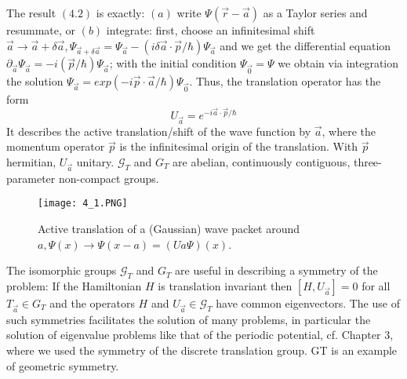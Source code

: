 The result $(4.2)$ is exactly: $(a)$ write $\Psi(\vec{r}-\vec{a})$ as a Taylor series and resummate, or $(b)$ integrate: first, choose an infinitesimal shift $\vec{a}\to\vec{a}+\delta\vec{a}, \Psi_{\vec{a}+\delta \vec{a}}=\Psi_{\vec{a}}-(i \delta \vec{a} \cdot \vec{p} / \hbar) \Psi_{\vec{a}}$ and we get the differential equation $\partial_{\vec{a}} \Psi_{\vec{a}}=-i(\vec{p} / \hbar) \Psi_{\vec{a}}$; with the initial condition $\Psi_{\vec{0}}=\Psi$ we obtain via integration the solution $\Psi_{\vec{a}}=exp(-i\vec{p}\cdot\vec{a}/\hbar)\Psi_{\vec{0}}$. Thus, the translation operator has the form
\begin{equation}
    U_{\vec{a}}=e^{-i\vec{a}\cdot \vec{p}/\hbar}
\end{equation}
It describes the active translation/shift of the wave function by $\vec{a}$, where the momentum operator $\vec{p}$ is the infinitesimal origin of the translation. With $\vec{p}$ hermitian, $U_{\vec{a}}$ unitary. $\mathcal{G}_T$ and $G_T$ are abelian, continuously contiguous, three-parameter non-compact groups.
\begin{figure}[ht]
    \begin{minipage}{0.5\textwidth}
        \centering
        \texttt{[image: 4\_1.PNG]}
    \end{minipage}
    \begin{minipage}{0.5\textwidth}
        \caption{Active translation of a (Gaussian) wave packet
        around $a, \Psi (x) \to \Psi (x - a) = (Ua\Psi) (x)$.}
    \end{minipage}
\end{figure}
The isomorphic groups $\mathcal{G}_T$ and $G_T$ are useful in describing a symmetry of the problem: If the Hamiltonian $H$ is translation invariant then $[H, U_{\vec{a}}] = 0$ for all $T_{\vec{a}}\in G_T$ and the operators $H$ and $U_{\vec{a}}\in\mathcal{G}_T$ have common eigenvectors. The use of such symmetries facilitates the solution of many problems, in particular the solution of eigenvalue problems like that of the periodic potential, cf. Chapter 3, where we used the symmetry of the discrete translation group. GT is an example of geometric symmetry.

